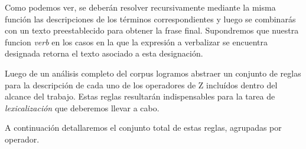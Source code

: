 \medskip
\begin{enumerate}	 
\end{enumerate}

Como podemos ver, se deberán resolver recursivamente mediante la misma función las descripciones de los términos correspondientes y luego se combinarás con un texto preestablecido para obtener la frase final.
Supondremos que nuestra funcion \emph{verb} en los casos en la que la expresión a verbalizar se encuentra designada retorna el texto asociado a esta designación.

Luego de un análisis completo del corpus logramos abstraer un conjunto de reglas para la descripción de cada uno de los operadores de Z incluídos dentro del alcance del trabajo. Estas reglas resultarán indispensables para la tarea de \emph{lexicalización} que deberemos llevar a cabo. 

A continuación detallaremos el conjunto total de estas reglas, agrupadas por operador.

